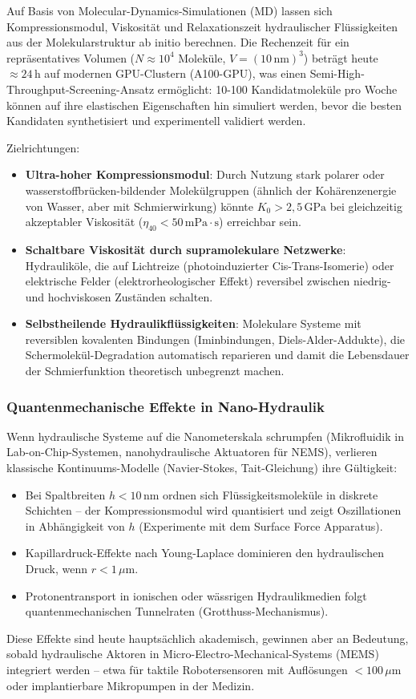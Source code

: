 ﻿\documentclass[a4paper,12pt]{scrreprt}
\theoremstyle{definition}
\begin{document}
Auf Basis von Molecular-Dynamics-Simulationen (MD) lassen sich
Kompressionsmodul, Viskosität und Relaxationszeit hydraulischer
Flüssigkeiten aus der Molekularstruktur ab initio berechnen.
Die Rechenzeit für ein repräsentatives Volumen
($N \approx 10^4$ Moleküle, $V = (10\,\mathrm{nm})^3$) beträgt
heute $\approx 24\,\mathrm{h}$ auf modernen GPU-Clustern (A100-GPU),
was einen Semi-High-Throughput-Screening-Ansatz ermöglicht:
10-100 Kandidatmoleküle pro Woche können auf ihre elastischen
Eigenschaften hin simuliert werden, bevor die besten Kandidaten
synthetisiert und experimentell validiert werden.

Zielrichtungen:
\begin{itemize}
  \item \textbf{Ultra-hoher Kompressionsmodul}: Durch Nutzung
    stark polarer oder wasserstoff\-brücken-bildender Molekülgruppen
    (ähnlich der Kohärenzenergie von Wasser, aber mit Schmierwirkung)
    könnte $K_0 > 2{,}5\,\mathrm{GPa}$ bei gleichzeitig akzeptabler
    Viskosität ($\eta_{40} < 50\,\mathrm{mPa\cdot s}$) erreichbar sein.
  \item \textbf{Schaltbare Viskosität durch supramolekulare Netzwerke}:
    Hydrauliköle, die auf Lichtreize (photoinduzierter Cis-Trans-Isomerie)
    oder elektrische Felder (elektrorheologischer Effekt) reversibel
    zwischen niedrig- und hochviskosen Zuständen schalten.
  \item \textbf{Selbstheilende Hydraulikflüssigkeiten}: Molekulare Systeme
    mit reversiblen kovalenten Bindungen (Iminbindungen, Diels-Alder-Addukte),
    die Schermolekül-Degradation automatisch reparieren und damit
    die Lebensdauer der Schmierfunktion theoretisch unbegrenzt machen.
\end{itemize}

\subsubsection{Quantenmechanische Effekte in Nano-Hydraulik}

Wenn hydraulische Systeme auf die Nanometerskala schrumpfen (Mikro\-fluidik in
Lab-on-Chip-Systemen, nanohydraulische Aktuatoren für NEMS),
verlieren klassische Kontinuums-Modelle (Navier-Stokes, Tait-Gleichung)
ihre Gültigkeit:
\begin{itemize}
  \item Bei Spaltbreiten $h < 10\,\mathrm{nm}$ ordnen sich
    Flüssigkeitsmoleküle in diskrete Schichten -- der Kompressionsmodul
    wird quantisiert und zeigt Oszillationen in Abhängigkeit von $h$
    (Experimente mit dem Surface Force Apparatus).
  \item Kapillardruck-Effekte nach Young-Laplace dominieren den
    hydraulischen Druck, wenn $r < 1\,\mu\mathrm{m}$.
  \item Protonentransport in ionischen oder wässrigen
    Hydraulikmedien folgt quantenmechanischen Tunnelraten (Grotthuss-Mechanismus).
\end{itemize}
Diese Effekte sind heute hauptsächlich akademisch, gewinnen aber an Bedeutung,
sobald hydraulische Aktoren in Micro-Electro-Mechanical-Systems (MEMS)
integriert werden -- etwa für taktile Robotersensoren mit Auflösungen
$< 100\,\mu\mathrm{m}$ oder implantierbare Mikropumpen in der Medizin.
\end{document}
